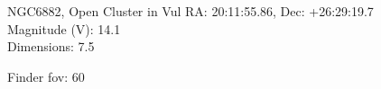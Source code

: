\begin{block}{NGC6882, Open Cluster in Vul}
    RA: 20:11:55.86, Dec: +26:29:19.7 \\ 
    Magnitude (V): 14.1 \\ 
    Dimensions: 7.5 

    Finder fov: 60 
\end{block}